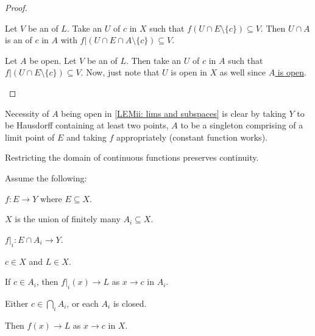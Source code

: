 	\begin{proof}
		\begin{mylist}
			\item Let $V$ be an \onbd of $L$. Take an \onbd $U$ of $c$ in $X$ such that $f(U\cap E\setminus\{c\})\subseteq V$. Then $U\cap A$ is an \onbd of $c$ in $A$ with $f|(U\cap E\cap A\setminus\{c\})\subseteq V$.
			
			\item Let $A$ be open. Let $V$ be an \onbd of $L$. Then take an \onbd $U$ of $c$ in $A$ such that $f|(U\cap E\setminus\{c\})\subseteq V$. Now, just note that $U$ is open in $X$ as well since \uline{$A$ is open}.
			\qedhere
		\end{mylist}
	\end{proof}
	
	\begin{rmk}
		Necessity of $A$ being open in \ref{LEMii: lims and subspaces} is clear by taking $Y$ to be Hausdorff containing at least two points, $A$ to be a singleton comprising of a limit point of $E$ and taking $f$ appropriately (constant function works).
	\end{rmk}
	
	\begin{cor}
		Restricting the domain of continuous functions preserves continuity.
	\end{cor}
	
	
	\begin{prp}
		Assume the following:
		\begin{assmplist}
			\item $f\colon E\to Y$ where $E\subseteq X$.
			\item $X$ is the union of finitely many $A_i\subseteq X$.
			\item $f|_i : E\cap A_i\to Y$.
			\item $c\in X$ and $L\in X$.
			\item If $c\in A_i$, then $f|_i(x)\to L$ as $x\to c$ in $A_i$.
			\item Either $c\in\bigcap_i A_i$, or each $A_i$ is closed.
		\end{assmplist}
		Then $f(x)\to L$ as $x\to c$ in $X$.
	\end{prp}
	
